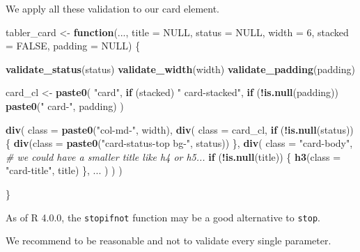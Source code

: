 \documentclass[
]{book}
\newenvironment{Shaded}{\begin{snugshade}}{\end{snugshade}}
\newcommand{\CommentTok}[1]{\textcolor[rgb]{0.56,0.35,0.01}{\textit{#1}}}
\newcommand{\ControlFlowTok}[1]{\textcolor[rgb]{0.13,0.29,0.53}{\textbf{#1}}}
\newcommand{\DataTypeTok}[1]{\textcolor[rgb]{0.13,0.29,0.53}{#1}}
\newcommand{\DecValTok}[1]{\textcolor[rgb]{0.00,0.00,0.81}{#1}}
\newcommand{\KeywordTok}[1]{\textcolor[rgb]{0.13,0.29,0.53}{\textbf{#1}}}
\newcommand{\NormalTok}[1]{#1}
\newcommand{\OperatorTok}[1]{\textcolor[rgb]{0.81,0.36,0.00}{\textbf{#1}}}
\newcommand{\OtherTok}[1]{\textcolor[rgb]{0.56,0.35,0.01}{#1}}
\newcommand{\StringTok}[1]{\textcolor[rgb]{0.31,0.60,0.02}{#1}}
\begin{document}
We apply all these validation to our card element.

\begin{Shaded}
\begin{Highlighting}[]
\NormalTok{tabler_card <-}\StringTok{ }\ControlFlowTok{function}\NormalTok{(..., }\DataTypeTok{title =} \OtherTok{NULL}\NormalTok{, }\DataTypeTok{status =} \OtherTok{NULL}\NormalTok{, }\DataTypeTok{width =} \DecValTok{6}\NormalTok{, }\DataTypeTok{stacked =} \OtherTok{FALSE}\NormalTok{, }\DataTypeTok{padding =} \OtherTok{NULL}\NormalTok{) \{}
  
  \KeywordTok{validate_status}\NormalTok{(status)}
  \KeywordTok{validate_width}\NormalTok{(width)}
  \KeywordTok{validate_padding}\NormalTok{(padding)}
  
\NormalTok{  card_cl <-}\StringTok{ }\KeywordTok{paste0}\NormalTok{(}
    \StringTok{"card"}\NormalTok{, }
    \ControlFlowTok{if}\NormalTok{ (stacked) }\StringTok{" card-stacked"}\NormalTok{,}
    \ControlFlowTok{if}\NormalTok{ (}\OperatorTok{!}\KeywordTok{is.null}\NormalTok{(padding)) }\KeywordTok{paste0}\NormalTok{(}\StringTok{" card-"}\NormalTok{, padding)}
\NormalTok{  )}
  
  \KeywordTok{div}\NormalTok{(}
    \DataTypeTok{class =} \KeywordTok{paste0}\NormalTok{(}\StringTok{"col-md-"}\NormalTok{, width),}
    \KeywordTok{div}\NormalTok{(}
      \DataTypeTok{class =}\NormalTok{ card_cl,}
      \ControlFlowTok{if}\NormalTok{ (}\OperatorTok{!}\KeywordTok{is.null}\NormalTok{(status)) \{}
        \KeywordTok{div}\NormalTok{(}\DataTypeTok{class =} \KeywordTok{paste0}\NormalTok{(}\StringTok{"card-status-top bg-"}\NormalTok{, status))}
\NormalTok{      \},}
      \KeywordTok{div}\NormalTok{(}
        \DataTypeTok{class =} \StringTok{"card-body"}\NormalTok{,}
        \CommentTok{# we could have a smaller title like h4 or h5...}
        \ControlFlowTok{if}\NormalTok{ (}\OperatorTok{!}\KeywordTok{is.null}\NormalTok{(title)) \{}
          \KeywordTok{h3}\NormalTok{(}\DataTypeTok{class =} \StringTok{"card-title"}\NormalTok{, title)}
\NormalTok{        \},}
\NormalTok{        ...}
\NormalTok{      )}
\NormalTok{    )}
\NormalTok{  )}
  
\NormalTok{\}}
\end{Highlighting}
\end{Shaded}

As of R 4.0.0, the \texttt{stopifnot} function may be a good alternative to \texttt{stop}.

We recommend to be reasonable and not to validate every single parameter.
\end{document}
